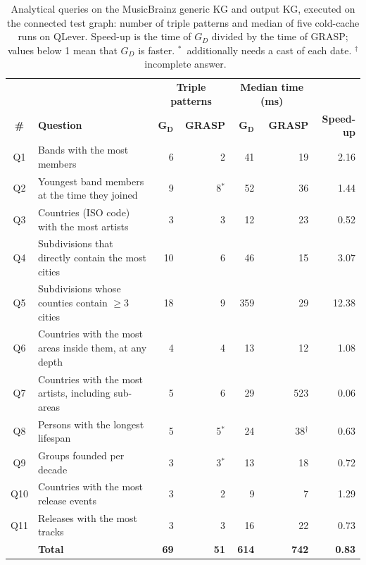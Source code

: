 \begin{table}[!htbp]
  \centering
  \small
  \renewcommand{\arraystretch}{1.3}
  \setlength{\tabcolsep}{4pt}
  \begin{tabular}{c >{\raggedright\arraybackslash}p{6.2cm} r r r r r}
    \hline
    & & \multicolumn{2}{c}{\textbf{Triple patterns}} & \multicolumn{2}{c}{\textbf{Median time (ms)}} & \\
    \textbf{\#} & \textbf{Question} & \(\boldsymbol{G_D}\) & \textbf{GRASP} & \(\boldsymbol{G_D}\) & \textbf{GRASP} & \textbf{Speed-up} \\
    \hline
    Q1  & Bands with the most members                                  & 6  & 2  & 41  & 19  & 2.16 \\
    Q2  & Youngest band members at the time they joined                & 9  & 8\(^{*}\) & 52 & 36 & 1.44 \\
    Q3  & Countries (ISO code) with the most artists                   & 3  & 3  & 12  & 23  & 0.52 \\
    Q4  & Subdivisions that directly contain the most cities           & 10 & 6  & 46  & 15  & 3.07 \\
    Q5  & Subdivisions whose counties contain \(\geq 3\) cities        & 18 & 9  & 359 & 29  & 12.38 \\
    Q6  & Countries with the most areas inside them, at any depth      & 4  & 4  & 13  & 12  & 1.08 \\
    Q7  & Countries with the most artists, including sub-areas         & 5  & 6  & 29  & 523 & 0.06 \\
    Q8  & Persons with the longest lifespan                            & 5  & 5\(^{*}\) & 24 & 38\(^{\dagger}\) & 0.63 \\
    Q9  & Groups founded per decade                                    & 3  & 3\(^{*}\) & 13 & 18 & 0.72 \\
    Q10 & Countries with the most release events                       & 3  & 2  & 9   & 7   & 1.29 \\
    Q11 & Releases with the most tracks                                & 3  & 3  & 16  & 22  & 0.73 \\
    \hline
        & \textbf{Total}                                               & \textbf{69} & \textbf{51} & \textbf{614} & \textbf{742} & \textbf{0.83} \\
    \hline
  \end{tabular}
  \caption[Analytical queries on the MusicBrainz KGs]{Analytical queries on the MusicBrainz generic KG and output KG, executed on the connected test graph: number of triple patterns and median of five cold-cache runs on QLever. Speed-up is the time of \(G_D\) divided by the time of GRASP; values below 1 mean that \(G_D\) is faster. \(^{*}\)~additionally needs a cast of each date. \(^{\dagger}\)~incomplete answer.}
  \label{tab:mb-queries}
\end{table}

